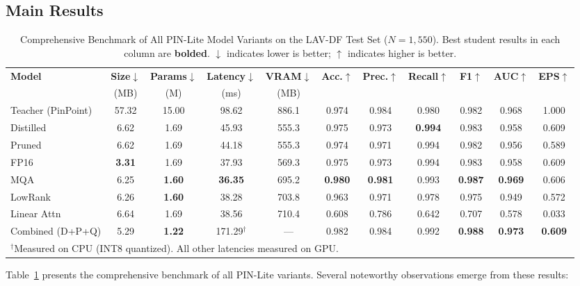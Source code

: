 \documentclass[lettersize,journal]{IEEEtran}
\begin{document}
\subsection{Main Results}

\begin{table}[!t]
\caption{Comprehensive Benchmark of All PIN-Lite Model Variants on the LAV-DF Test Set ($N = 1{,}550$). Best student results in each column are \textbf{bolded}. $\downarrow$ indicates lower is better; $\uparrow$ indicates higher is better.\label{tab:main_results}}
\centering
\footnotesize
\begin{tabular}{lcccccccccc}
\toprule
\textbf{Model} & \textbf{Size$\downarrow$} & \textbf{Params$\downarrow$} & \textbf{Latency$\downarrow$} & \textbf{VRAM$\downarrow$} & \textbf{Acc.$\uparrow$} & \textbf{Prec.$\uparrow$} & \textbf{Recall$\uparrow$} & \textbf{F1$\uparrow$} & \textbf{AUC$\uparrow$} & \textbf{EPS$\uparrow$} \\
& (MB) & (M) & (ms) & (MB) & & & & & & \\
\midrule
Teacher (PinPoint) & 57.32 & 15.00 & 98.62 & 886.1 & 0.974 & 0.984 & 0.980 & 0.982 & 0.968 & 1.000 \\
\midrule
Distilled & 6.62 & 1.69 & 45.93 & 555.3 & 0.975 & 0.973 & \textbf{0.994} & 0.983 & 0.958 & 0.609 \\
Pruned & 6.62 & 1.69 & 44.18 & 555.3 & 0.974 & 0.971 & 0.994 & 0.982 & 0.956 & 0.589 \\
FP16 & \textbf{3.31} & 1.69 & 37.93 & 569.3 & 0.975 & 0.973 & 0.994 & 0.983 & 0.958 & 0.609 \\
MQA & 6.25 & \textbf{1.60} & \textbf{36.35} & 695.2 & \textbf{0.980} & \textbf{0.981} & 0.993 & \textbf{0.987} & \textbf{0.969} & 0.606 \\
LowRank & 6.26 & \textbf{1.60} & 38.28 & 703.8 & 0.963 & 0.971 & 0.978 & 0.975 & 0.949 & 0.572 \\
Linear Attn & 6.64 & 1.69 & 38.56 & 710.4 & 0.608 & 0.786 & 0.642 & 0.707 & 0.578 & 0.033 \\
Combined (D+P+Q) & 5.29 & \textbf{1.22} & 171.29$^\dagger$ & --- & 0.982 & 0.984 & 0.992 & \textbf{0.988} & \textbf{0.973} & \textbf{0.609} \\
\bottomrule
\multicolumn{11}{l}{\footnotesize $^\dagger$Measured on CPU (INT8 quantized). All other latencies measured on GPU.}
\end{tabular}
\end{table}

Table~\ref{tab:main_results} presents the comprehensive benchmark of all PIN-Lite variants. Several noteworthy observations emerge from these results:
\end{document}
